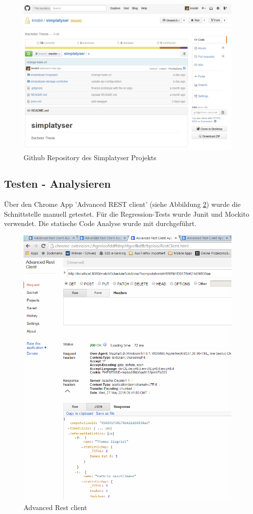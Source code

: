 \begin{figure}[h]
\centering
\includegraphics[scale=0.5]{images/github.png}
\caption[Github Repository des Simplatyser Projekts]{Github Repository des Simplatyser Projekts \selfmade{}}
\label{fig:github_repo}
\end{figure}

\subsection{Testen - Analysieren}
 Über den Chrome App 'Advanced REST client' (siehe Abbildung \ref{fig:advanced_rest_client})  wurde die Schnittstelle manuell getestet. Für die Regression-Tests wurde Junit und Mockito 
verwendet. Die statische Code Analyse wurde mit  \cite{sonar} durchgeführt.

\begin{figure}[h]
\centering
\includegraphics[scale=0.7]{images/advanced_rest_client.png}
\caption[Advanced Rest client]{Advanced Rest client \selfmade{}}
\label{fig:advanced_rest_client}
\end{figure}